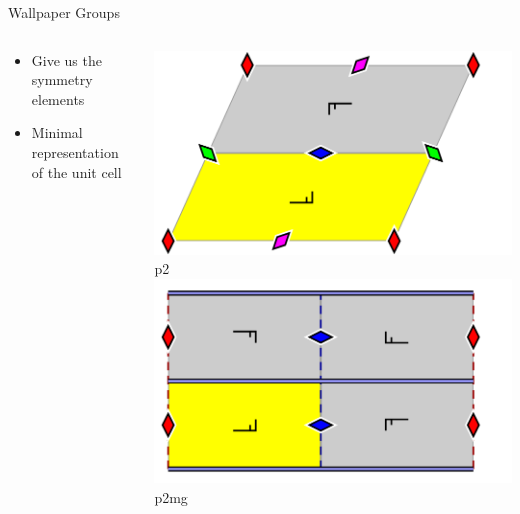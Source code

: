 \documentclass[16pt, aspectratio=43,compress]{beamer}
\begin{document}

\begin{frame}{Wallpaper Groups}
    \begin{columns}
        \begin{column}{0.5\linewidth}
            \begin{itemize}
                \item Give us the symmetry elements
                \item Minimal representation of the unit cell
            \end{itemize}
        \end{column}
        \begin{column}{0.5\linewidth}
            \centering
            \includegraphics[width=\textwidth]{p2}\\
            p2\\
            \includegraphics[width=\textwidth]{p2mg}\\
            p2mg
        \end{column}
    \end{columns}
\end{frame}
\end{document}
